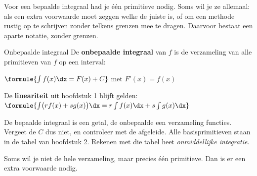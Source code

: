 Voor een bepaalde integraal had je één primitieve nodig. Soms wil je ze allemaal: als een extra voorwaarde moet zeggen welke de juiste is, of om een methode rustig op te schrijven zonder telkens grenzen mee te dragen. Daarvoor bestaat een aparte notatie, zonder grenzen.

\begin{theorie}
\begin{stelling}{Onbepaalde integraal}
De \textbf{\textcolor{accent}{onbepaalde integraal}} van $f$ is de verzameling van alle primitieven van $f$ op een interval:

\vspace{1mm}
\qquad $\formule{\int f(x)\dx = F(x) + C}$ \quad met $F'(x) = f(x)$
\end{stelling}

De \textbf{\textcolor{accent}{lineariteit}} uit hoofdstuk 1 blijft gelden: \quad $\formule{\int \bigl(r f(x) + s g(x)\bigr)\dx = r\int f(x)\dx + s\int g(x)\dx}$
\end{theorie}

De bepaalde integraal is een getal, de onbepaalde een verzameling functies. Vergeet de $C$ dus niet, en controleer met de afgeleide. Alle basisprimitieven staan in de tabel van hoofdstuk 2. Rekenen met die tabel heet \emph{onmiddellijke integratie}.


Soms wil je niet de hele verzameling, maar precies één primitieve. Dan is er een extra voorwaarde nodig.



